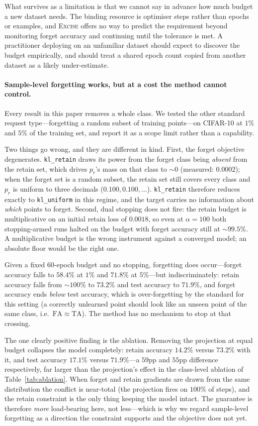 \documentclass{article}
\newcommand{\ours}{\textsc{Excise}}
\newcommand{\klr}{\texttt{kl\_retain}}
\theoremstyle{remark}
\theoremstyle{plain}
\begin{document}
What survives as a limitation is that we cannot say in advance how much budget a
new dataset needs. The binding resource is optimiser steps rather than epochs or
examples, and \ours{} offers no way to predict the requirement beyond monitoring
forget accuracy and continuing until the tolerance is met. A practitioner
deploying on an unfamiliar dataset should expect to discover the budget
empirically, and should treat a shared epoch count copied from another dataset
as a likely under-estimate.


\paragraph{Sample-level forgetting works, but at a cost the method cannot
control.} Every result in this paper removes a whole class. We tested the other
standard request type---forgetting a random subset of training points---on
CIFAR-10 at $1\%$ and $5\%$ of the training set, and report it as a scope limit
rather than a capability.

Two things go wrong, and they are different in kind. First, the forget objective
degenerates. \klr{} draws its power from the forget class being \emph{absent}
from the retain set, which drives $p_r$'s mass on that class to ${\sim}0$
(measured: $0.0002$); when the forget set is a random subset, the retain set
still covers every class and $p_r$ is uniform to three decimals
($0.100,0.100,\dots$). \klr{} therefore reduces exactly to
\texttt{kl\_uniform} in this regime, and the target carries no information about
\emph{which} points to forget. Second, dual stopping does not fire: the retain
budget is multiplicative on an initial retain loss of $0.0018$, so even at
$\alpha = 100$ both stopping-armed runs halted on the budget with forget accuracy
still at ${\sim}99.5\%$. A multiplicative budget is the wrong instrument against
a converged model; an absolute floor would be the right one.

Given a fixed 60-epoch budget and no stopping, forgetting does occur---forget
accuracy falls to $58.4\%$ at $1\%$ and $71.8\%$ at $5\%$---but
indiscriminately: retain accuracy falls from ${\sim}100\%$ to $73.2\%$ and test
accuracy to $71.9\%$, and forget accuracy ends \emph{below} test accuracy, which
is over-forgetting by the standard for this setting (a correctly unlearned point
should look like an unseen point of the same class, i.e.\ $\mathrm{FA}\approx
\mathrm{TA}$). The method has no mechanism to stop at that crossing.

The one clearly positive finding is the ablation. Removing the projection at
equal budget collapses the model completely: retain accuracy $14.2\%$ versus
$73.2\%$ with it, and test accuracy $17.1\%$ versus $71.9\%$---a $59$pp and
$55$pp difference respectively, far larger than the projection's effect in the
class-level ablation of Table~\ref{tab:ablation}. When forget and retain
gradients are drawn from the same distribution the conflict is near-total (the
projection fires on $100\%$ of steps), and the retain constraint is the only
thing keeping the model intact. The guarantee is therefore \emph{more}
load-bearing here, not less---which is why we regard sample-level forgetting as
a direction the constraint supports and the objective does not yet.
\end{document}
